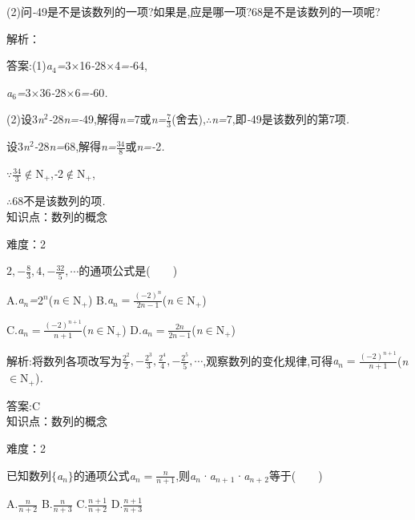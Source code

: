 \documentclass{article} %
\begin{document}
 (2)问\textit{-}49是不是该数列的一项?如果是,应是哪一项?68是不是该数列的一项呢?

解析：

 答案:(1)\textit{a}${}_{4}$\textit{=}3\textit{$\times$}16\textit{-}28\textit{$\times$}4\textit{=-}64,

\textit{a}${}_{6}$\textit{=}3\textit{$\times$}36\textit{-}28\textit{$\times$}6\textit{=-}60\textit{.}

(2)设3\textit{n}${}^{2}$\textit{-}28\textit{n=-}49,解得\textit{n=}7或\textit{n=}$\frac{7}{3}$(舍去),\textit{$\therefore$n=}7,即\textit{-}49是该数列的第7项\textit{.}

设3\textit{n}${}^{2}$\textit{-}28\textit{n=}68,解得\textit{n=}$\frac{34}{8}$或\textit{n=-}2\textit{.}

\textit{$\because$}$\frac{34}{3}$$\mathrm{\notin}$N\textit{${}_{+}$},\textit{-}2$\mathrm{\notin}$N\textit{${}_{+}$},

\textit{$\therefore$}68不是该数列的项\textit{.} \\



知识点：数列的概念

难度：2

$2,-\frac{8}{3},4,-\frac{32}{5},\cdots$的通项公式是(\textit{　　})

 A.\textit{a${}_{n}$=}2\textit{${}^{n}$}(\textit{n}$\mathrm{\in}$N\textit{${}_{+}$}) B.\textit{a${}_{n}=\frac{(-2)^n}{2n-1}$}(\textit{n}$\mathrm{\in}$N\textit{${}_{+}$})

 C.\textit{a${}_{n}=\frac{(-2)^{n+1}}{n+1}$}(\textit{n}$\mathrm{\in}$N\textit{${}_{+}$}) D.\textit{a${}_{n}=\frac{2n}{2n-1}$}(\textit{n}$\mathrm{\in}$N\textit{${}_{+}$})

 解析:将数列各项改写为$\frac{2^2}{2},-\frac{2^3}{3},\frac{2^4}{4},-\frac{2^5}{5},\cdots$,观察数列的变化规律,可得\textit{a${}_{n}=\frac{(-2)^{n+1}}{n+1}$}(\textit{n}$\mathrm{\in}$N\textit{${}_{+}$})\textit{.}
 
 答案:C \\

知识点：数列的概念

难度：2

 
已知数列$\mathrm{\{}$\textit{a${}_{n}$}$\mathrm{\}}$的通项公式\textit{a${}_{n}=\frac{n}{n+1}$},则\textit{a${}_{n}$}·\textit{a${}_{n+}$}${}_{1}$·\textit{a${}_{n+}$}${}_{2}$等于(\textit{　　})

 A.\textit{$ \frac{n}{n+2} $} B.\textit{$ \frac{n}{n+3} $} C.\textit{$ \frac{n+1}{n+2} $} D.\textit{$ \frac{n+1}{n+3} $}
\end{document}
